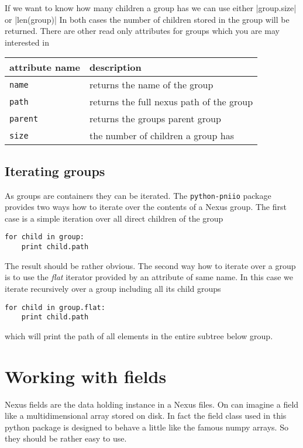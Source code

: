 If we want to know how many children a group has we can use either
|group.size| or |len(group)|
In both cases the number of children stored in the group will be returned.
There are other read only attributes for groups which you are may interested in
\begin{center}
\begin{tabular}{l|l}
attribute name & description \\
\hline \hline
{\tt name} & returns the name of the group \\
\hline
{\tt path} & returns the full nexus path of the group\\
\hline
{\tt parent} & returns the groups parent group \\
\hline
{\tt size} & the number of children a group has \\
\end{tabular}
\end{center}

\subsection{Iterating groups}

As groups are containers they can be iterated. The {\tt python-pniio}
package provides two ways how to iterate over the contents of a Nexus group. 
The first case is a simple iteration over all direct children of the group
\begin{verbatim}
for child in group:
    print child.path
\end{verbatim}
The result should be rather obvious. The second way how to iterate over a group
is to use the \emph{flat} iterator provided by an attribute of same name. 
In this case we iterate recursively over a group including all its child groups
\begin{verbatim}
for child in group.flat:
    print child.path
\end{verbatim}
which will print the path of all elements in the entire subtree below group.

\section{Working with fields}

Nexus fields are the data holding instance in a Nexus files. On can imagine a
field like a multidimensional array stored on disk. In fact the field class 
used in this python package is designed to behave a little like the famous numpy
arrays. So they should be rather easy to use. 

